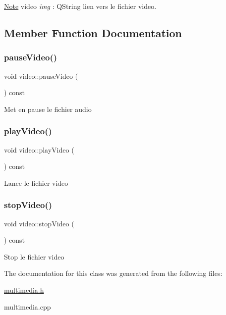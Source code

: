 \hyperlink{class_note}{Note} video {\itshape img} \+: Q\+String lien vers le fichier video. 

\subsection{Member Function Documentation}
\mbox{\label{classvideo_a0764c1d92417fdf53a29121ba7caa395}} 
\subsubsection{\texorpdfstring{pause\+Video()}{pauseVideo()}}
{\footnotesize\ttfamily void video\+::pause\+Video (\begin{DoxyParamCaption}{ }\end{DoxyParamCaption}) const}

Met en pause le fichier audio \mbox{\label{classvideo_a557dedaa9915167c5a4ad1eacc9c8a27}} 
\subsubsection{\texorpdfstring{play\+Video()}{playVideo()}}
{\footnotesize\ttfamily void video\+::play\+Video (\begin{DoxyParamCaption}{ }\end{DoxyParamCaption}) const}

Lance le fichier video \mbox{\label{classvideo_ac1ead8f204bd32ca5bff3eb0748e5ca7}} 
\subsubsection{\texorpdfstring{stop\+Video()}{stopVideo()}}
{\footnotesize\ttfamily void video\+::stop\+Video (\begin{DoxyParamCaption}{ }\end{DoxyParamCaption}) const}

Stop le fichier video 

The documentation for this class was generated from the following files\+:\begin{DoxyCompactItemize}
\item 
\hyperlink{multimedia_8h}{multimedia.\+h}\item 
multimedia.\+cpp\end{DoxyCompactItemize}
